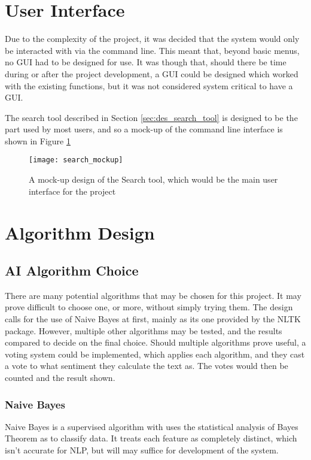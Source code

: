 \section{User Interface}
\label{sec:des_user_interface}
Due to the complexity of the project, it was decided that the system would only be interacted with via the command line. This meant that, beyond basic menus, no GUI had to be designed for use. It was though that, should there be time during or after the project development, a GUI could be designed which worked with the existing functions, but it was not considered system critical to have a GUI.

The search tool described in Section \ref{sec:des_search_tool} is designed to be the part used by most users, and so a mock-up of the command line interface is shown in Figure \ref{fig:search_mockup}

\begin{figure}[ht]
\texttt{[image: search\_mockup]}
\caption{A mock-up design of the Search tool, which would be the main user interface for the project}
\label{fig:search_mockup}
\end{figure}

\section{Algorithm Design}
\label{sec:des_algorithm}

\subsection{AI Algorithm Choice}
\label{sec:des_AI_algorithm}
There are many potential algorithms that may be chosen for this project. It may prove difficult to choose one, or more, without simply trying them. The design calls for the use of Naive Bayes at first, mainly as its one provided by the NLTK package. However, multiple other algorithms may be tested, and the results compared to decide on the final choice. Should multiple algorithms prove useful, a voting system could be implemented, which applies each algorithm, and they cast a vote to what sentiment they calculate the text as. The votes would then be counted and the result shown.

\subsubsection{Naive Bayes}
\label{sec:des_naive_bayes}
Naive Bayes is a supervised algorithm with uses the statistical analysis of Bayes Theorem as to classify data. It treats each feature as completely distinct, which isn't accurate for NLP, but will may suffice for development of the system.

